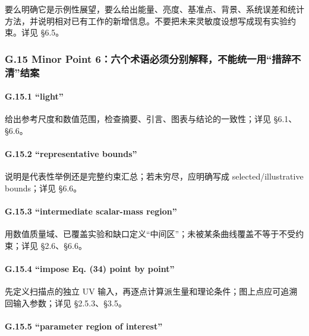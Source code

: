 \documentclass[
  chinese,
  UTF8]{ctexart}
\begin{document}
要么明确它是示例性展望，要么给出能量、亮度、基准点、背景、系统误差和统计方法，并说明相对已有工作的新增信息。不要把未来灵敏度设想写成现有实验约束。详见
§6.5。

\subsubsection{G.15 Minor Point
6：六个术语必须分别解释，不能统一用``措辞不清''结案}\label{g.15-minor-point-6ux516dux4e2aux672fux8bedux5fc5ux987bux5206ux522bux89e3ux91caux4e0dux80fdux7edfux4e00ux7528ux63aaux8f9eux4e0dux6e05ux7ed3ux6848}

\paragraph{G.15.1 ``light''}\label{g.15.1-light}

给出参考尺度和数值范围，检查摘要、引言、图表与结论的一致性；详见
§6.1、§6.6。

\paragraph{G.15.2 ``representative
bounds''}\label{g.15.2-representative-bounds}

说明是代表性举例还是完整约束汇总；若未穷尽，应明确写成
selected/illustrative bounds；详见 §6.6。

\paragraph{G.15.3 ``intermediate scalar-mass
region''}\label{g.15.3-intermediate-scalar-mass-region}

用数值质量域、已覆盖实验和缺口定义``中间区''；未被某条曲线覆盖不等于不受约束；详见
§2.6、§6.6。

\paragraph{G.15.4 ``impose Eq. (34) point by
point''}\label{g.15.4-impose-eq.-34-point-by-point}

先定义扫描点的独立 UV
输入，再逐点计算派生量和理论条件；图上点应可追溯回输入参数；详见
§2.5.3、§3.5。

\paragraph{G.15.5 ``parameter region of
interest''}\label{g.15.5-parameter-region-of-interest}
\end{document}
